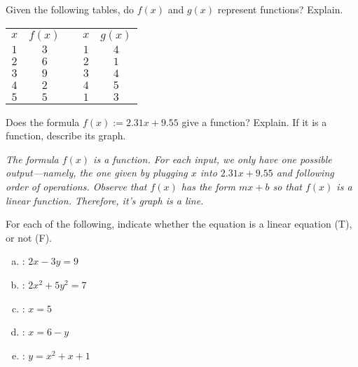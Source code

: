 \documentclass[11pt,letterpaper]{article}
\begin{document}
\newpage



 Given the following tables, do $f(x)$ and $g(x)$ represent functions? Explain. 
	\begin{table}[!ht]
	\centering \setlength\arrayrulewidth{0.02cm}
	\begin{tabular}{c|ccc|c} 
	$x$ & $f(x)$ & \hspace{2cm} & $x$ & $g(x)$ \\ \cline{1-2} \cline{4-5}
	$1$ & $3$ && $1$ & $4$ \\
	$2$ & $6$ && $2$ & $1$ \\
	$3$ & $9$ && $3$ & $4$ \\
	$4$ & $2$ && $4$ & $5$ \\
	$5$ & $5$ && $1$ & $3$  
	\end{tabular}
	\end{table} \pspace

	


\vfill
\newpage



 Does the formula $f(x):= 2.31x + 9.55$ give a function? Explain. If it is a function, describe its graph. \pspace

{\itshape The formula $f(x)$ is a function. For each input, we only have one possible output---namely, the one given by plugging $x$ into $2.31x + 9.55$ and following order of operations. Observe that $f(x)$ has the form $mx + b$ so that $f(x)$ is a linear function. Therefore, it's graph is a line.} \pvspace{2.1cm} 



 For each of the following, indicate whether the equation is a linear equation (T), or not (F). 
	\begin{enumerate}[(a)]
	\item {}: $2x - 3y= 9$
	\item {}: $2x^2 + 5y^2= 7$
	\item {}: $x= 5$
	\item {}: $x= 6- y$
	\item {}: $y= x^2 + x + 1$
	\end{enumerate}
\end{document}
